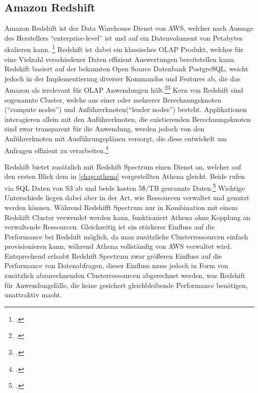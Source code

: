 

\subsection{Amazon Redshift}

Amazon Redshift ist der Data Warehouse Dienst von \ac{AWS}, welcher nach Aussage des Herstellers \enquote{enterprise-level} ist und auf ein Datenvolument von Petabytes skalieren kann. \footcite[Vgl.][1]{AmazonWebServicesInc..o.J.g} Redshift ist dabei ein klassisches \ac{OLAP} Produkt, welches für eine Vielzahl verschiedener Daten effizient Auswertungen bereitstellen kann. Redshift basiert auf der bekannten Open Source Datenbank PostgreSQL, weicht jedoch in der Implementierung diverser Kommandos und Features ab, die das Amazon als irrelevant für \ac{OLAP} Anwendungen hält.\footcite[Vgl.][4]{AmazonWebServicesInc..o.J.g}\nzitat\footcite[Vgl.][428\psqq]{AmazonWebServicesInc..o.J.g} Kern von Redshift sind sogenannte Cluster, welche aus einer oder mehrerer Berechnungsknoten (\enquote{compute nodes}) und Anführerknoten(\enquote{leader nodes}) besteht. Applikationen interagieren allein mit den Anführerknoten, die existierenden Berechnungsknoten sind zwar transparent für die Anwendung, werden jedoch von den Anführerknoten mit Ausführungsplänen versorgt, die diese entwickelt um Anfragen effizient zu verarbeiten.\footcite[Vgl.][4]{AmazonWebServicesInc..o.J.g}

Redshift bietet zusätzlich mit Redshift Spectrum einen Dienst an, welcher auf den ersten Blick dem in \autoref{chap:athena} vorgestellten Athena gleicht. Beide rufen via \ac{SQL} Daten von \ac{S3} ab und beide kosten 5\$/TB gescannte Daten.\footcite[Vgl. auch im Folgenden][]{Smallcombe.2020} Wichtige Unterschiede liegen dabei aber in der Art, wie Ressourcen verwaltet und genutzt werden können. Während Redshifft Spectrum nur in Kombination mit einem Redshift Cluster verwendet werden kann, funktioniert Athena ohne Kopplung an verwaltende Ressourcen. Gleichzeitig ist ein stärkerer Einfluss auf die Performance bei Redshift möglich, da man zusätzliche Clusterressourcen einfach provisionieren kann, während Athena vollständig von \ac{AWS} verwaltet wird. Entsprechend erlaubt Redshift Spectrum zwar größeren Einfluss auf die Performance von Datenabfragen, dieser Einfluss muss jedoch in Form von zusätzlich abzurechnenden Clusterressourcen abgerechnet werden, was Redshift für Anwendungsfälle, die keine gesichert gleichbleibende Performance benötigen, unattraktiv macht.



